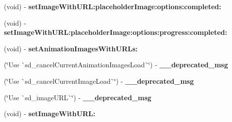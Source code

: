 \begin{DoxyCompactItemize}
\item 
\mbox{\label{category_u_i_image_view_07_web_cache_deprecated_08_ab6d74e590766c217b23f326339591e1d}} 
(void) -\/ {\bfseries set\+Image\+With\+U\+R\+L\+:placeholder\+Image\+:options\+:completed\+:}
\item 
\mbox{\label{category_u_i_image_view_07_web_cache_deprecated_08_a828f2953a000953933379e6400acad98}} 
(void) -\/ {\bfseries set\+Image\+With\+U\+R\+L\+:placeholder\+Image\+:options\+:progress\+:completed\+:}
\item 
\mbox{\label{category_u_i_image_view_07_web_cache_deprecated_08_ad1d56b45c88fda02294d2df8c820c175}} 
(void) -\/ {\bfseries set\+Animation\+Images\+With\+U\+R\+Ls\+:}
\item 
\mbox{\label{category_u_i_image_view_07_web_cache_deprecated_08_ac76fd2691079d4ecf8e24913a99ceb60}} 
(\char`\"{}Use \`{}sd\+\_\+cancel\+Current\+Animation\+Images\+Load\`{}\char`\"{}) -\/ {\bfseries \+\_\+\+\_\+deprecated\+\_\+msg}
\item 
\mbox{\label{category_u_i_image_view_07_web_cache_deprecated_08_a0184d8f358c9009de3cf96d844df495b}} 
(\char`\"{}Use \`{}sd\+\_\+cancel\+Current\+Image\+Load\`{}\char`\"{}) -\/ {\bfseries \+\_\+\+\_\+deprecated\+\_\+msg}
\item 
\mbox{\label{category_u_i_image_view_07_web_cache_deprecated_08_abce1b9f769f99947aa3b2829fb1a977a}} 
(\char`\"{}Use \`{}sd\+\_\+image\+U\+RL\`{}\char`\"{}) -\/ {\bfseries \+\_\+\+\_\+deprecated\+\_\+msg}
\item 
\mbox{\label{category_u_i_image_view_07_web_cache_deprecated_08_ab266b5f32655763bcc040d89fde5515f}} 
(void) -\/ {\bfseries set\+Image\+With\+U\+R\+L\+:}
\item 
\mbox{\label{category_u_i_image_view_07_web_cache_deprecated_08_aa8fe46f136bc683f2b9a1774f3b14c1e}} 

\end{DoxyCompactItemize}
